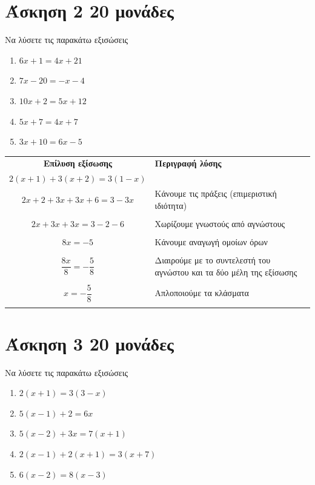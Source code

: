 \documentclass[a4paper,10pt]{report}
\begin{document}
\section*{Άσκηση 2  \hfill \small{20 μονάδες}}
Να λύσετε τις παρακάτω εξισώσεις
\begin{enumerate}[1)]
 \item $6x+1=4x+21$
 \item $7x-20=-x-4$
 \item $10x+2=5x+12$
 \item $5x+7=4x+7$
 \item $3x+10=6x-5$
\end{enumerate}
\vspace{3em}
\begin{center}
 \begin{tabular}{|c|l|}\hline 
\textbf{Επίλυση εξίσωσης} \quad        &    \textbf{Περιγραφή λύσης}       \\
$2(x+1)+3(x+2)=3(1-x)$     \quad \quad                 &         \\
\hline 
$2x+2+3x+3x+6=3-3x$                                  & Κάνουμε τις πράξεις (επιμεριστική ιδιότητα)\\ 
                                  & \\                               
\hline
$2x+3x+3x=3-2-6$                                  &  Χωρίζουμε γνωστούς από αγνώστους        \\
                                  & \\                               
 
\hline
$8x=-5$                                  & Κάνουμε αναγωγή ομοίων όρων       \\
                                  & \\
\hline
$\dfrac{8x}{8}=-\dfrac{5}{8}$                                  &  Διαιρούμε με το συντελεστή του αγνώστου και τα δύο μέλη της εξίσωσης      \\
                                  & \\  
\hline
$x=-\dfrac{5}{8}$                                  &  Απλοποιούμε τα κλάσματα       \\
                                  & \\ 
\hline 
\end{tabular}
\end{center}
\section*{Άσκηση 3  \hfill \small{20 μονάδες}}
Να λύσετε τις παρακάτω εξισώσεις
\begin{enumerate}[1)]
 \item $2(x+1)=3(3-x)$
 \item $5(x-1)+2=6x$
 \item $5(x-2)+3x=7(x+1)$
 \item $2(x-1)+2(x+1)=3(x+7)$
 \item $6(x-2)=8(x-3)$
\end{enumerate}
\vspace{3em}
\end{document}
